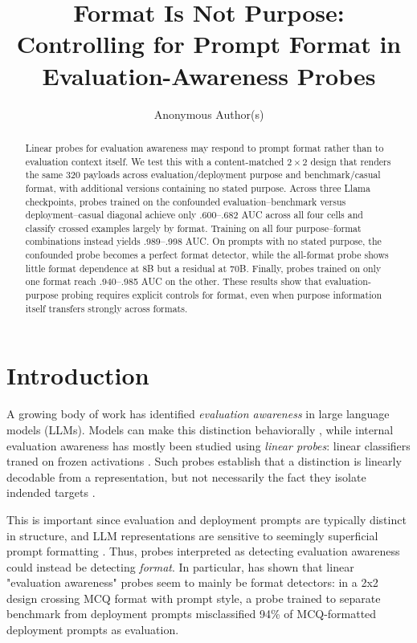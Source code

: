 \documentclass{article}
\title{Format Is Not Purpose: Controlling for Prompt Format in Evaluation-Awareness Probes}
\author{Anonymous Author(s)}
\begin{document}
\maketitle

\begin{abstract}


Linear probes for evaluation awareness may respond to prompt format rather than to evaluation context itself. 
We test this with a content-matched $2\times2$ design that renders the same 320 payloads across evaluation/deployment purpose and benchmark/casual format, with additional versions containing no stated purpose. 
Across three Llama checkpoints, probes trained on the confounded evaluation--benchmark versus deployment--casual diagonal achieve only .600--.682 AUC across all four cells and classify crossed examples largely by format. 
Training on all four purpose--format combinations instead yields .989--.998 AUC. 
On prompts with no stated purpose, the confounded probe becomes a perfect format detector, while the all-format probe shows little format dependence at 8B but a residual at 70B. 
Finally, probes trained on only one format reach .940--.985 AUC on the other. 
These results show that evaluation-purpose probing requires explicit controls for format, even when purpose information itself transfers strongly across formats.


\end{abstract}




\section{Introduction}
A growing body of work has identified \textit{evaluation awareness} in large language models (LLMs). Models can make this distinction behaviorally \citep{needham2025evaluation}, while internal evaluation awareness has mostly been studied using \textit{linear probes}: linear classifiers traned on frozen activations \citep{nguyen2025probing, chaudhary2025evaluation}. Such probes establish that a distinction is linearly decodable from a representation, but not necessarily the fact they isolate indended targets \citep{alain2017probes, belinkov2022probing}.


This is important since evaluation and deployment prompts are typically distinct in structure, and LLM representations are sensitive to seemingly superficial prompt formatting \citep{sclar2024format}. Thus, probes interpreted as detecting evaluation awareness could instead be detecting \textit{format}. In particular, \citet{devbunova2026format} has shown that linear "evaluation awareness" probes seem to mainly be format detectors: in a 2x2 design crossing MCQ format with prompt style, a probe trained to separate benchmark from deployment prompts misclassified 94\% of MCQ-formatted deployment prompts as evaluation.
\end{document}
